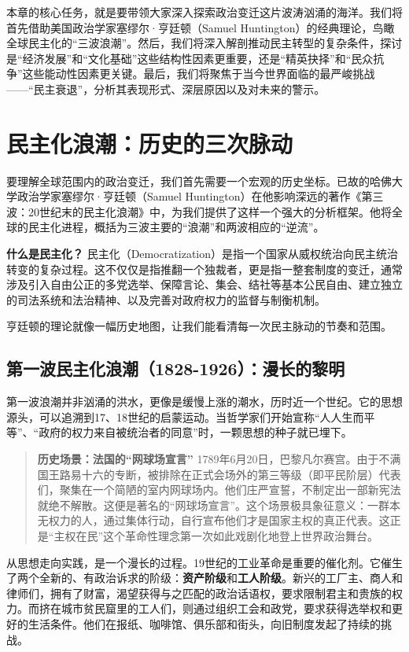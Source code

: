 本章的核心任务，就是要带领大家深入探索政治变迁这片波涛汹涌的海洋。我们将首先借助美国政治学家塞缪尔·亨廷顿（Samuel Huntington）的经典理论，鸟瞰全球民主化的“三波浪潮”。然后，我们将深入解剖推动民主转型的复杂条件，探讨是“经济发展”和“文化基础”这些结构性因素更重要，还是“精英抉择”和“民众抗争”这些能动性因素更关键。最后，我们将聚焦于当今世界面临的最严峻挑战——“民主衰退”，分析其表现形式、深层原因以及对未来的警示。

\section{民主化浪潮：历史的三次脉动}

要理解全球范围内的政治变迁，我们首先需要一个宏观的历史坐标。已故的哈佛大学政治学家塞缪尔·亨廷顿（Samuel Huntington）在他影响深远的著作《第三波：20世纪末的民主化浪潮》中，为我们提供了这样一个强大的分析框架。他将全球的民主化进程，概括为三波主要的“浪潮”和两波相应的“逆流”。

\textbf{什么是民主化？} 民主化（Democratization）是指一个国家从威权统治向民主统治转变的复杂过程。这不仅仅是指推翻一个独裁者，更是指一整套制度的变迁，通常涉及引入自由公正的多党选举、保障言论、集会、结社等基本公民自由、建立独立的司法系统和法治精神、以及完善对政府权力的监督与制衡机制。

亨廷顿的理论就像一幅历史地图，让我们能看清每一次民主脉动的节奏和范围。

\subsection{第一波民主化浪潮（1828-1926）：漫长的黎明}

第一波浪潮并非汹涌的洪水，更像是缓慢上涨的潮水，历时近一个世纪。它的思想源头，可以追溯到17、18世纪的启蒙运动。当哲学家们开始宣称“人人生而平等”、“政府的权力来自被统治者的同意”时，一颗思想的种子就已埋下。

\begin{quote}
\textbf{历史场景：法国的“网球场宣言”}
1789年6月20日，巴黎凡尔赛宫。由于不满国王路易十六的专断，被排除在正式会场外的第三等级（即平民阶层）代表们，聚集在一个简陋的室内网球场内。他们庄严宣誓，不制定出一部新宪法就绝不解散。这便是著名的“网球场宣言”。这个场景极具象征意义：一群本无权力的人，通过集体行动，自行宣布他们才是国家主权的真正代表。这正是“主权在民”这个革命性理念第一次如此戏剧化地登上世界政治舞台。
\end{quote}

从思想走向实践，是一个漫长的过程。19世纪的工业革命是重要的催化剂。它催生了两个全新的、有政治诉求的阶级：\textbf{资产阶级}和\textbf{工人阶级}。新兴的工厂主、商人和律师们，拥有了财富，渴望获得与之匹配的政治话语权，要求限制君主和贵族的权力。而挤在城市贫民窟里的工人们，则通过组织工会和政党，要求获得选举权和更好的生活条件。他们在报纸、咖啡馆、俱乐部和街头，向旧制度发起了持续的挑战。

